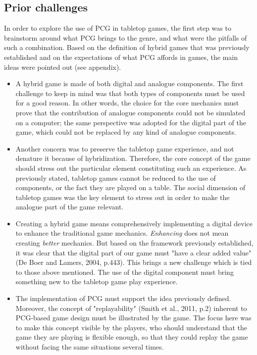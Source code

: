 \subsection{Prior challenges}
In order to explore the use of PCG in tabletop games, the first step was to brainstorm around what PCG brings to the genre, and what were the pitfalls of such a combination. Based on the definition of hybrid games that was previously established and on the expectations of what PCG affords in games, the main ideas were pointed out (see appendix).
\begin{itemize}
\item A hybrid game is made of both digital and analogue components. The first challenge to keep in mind was that both types of components must be used for a good reason. In other words, the choice for the core mechanics must prove that the contribution of analogue components could not be simulated on a computer; the same perspective was adopted for the digital part of the game, which could not be replaced by any kind of analogue components.  
\item Another concern was to preserve the tabletop game experience, and not denature it because of hybridization. Therefore, the core concept of the game should stress out the particular element constituting such an experience. As previously stated, tabletop games cannot be reduced to the use of components, or the fact they are played on a table. The social dimension of tabletop games was the key element to stress out in order to make the analogue part of the game relevant.
\item Creating a hybrid game means comprehensively implementing a digital device to enhance the traditional game mechanics. \textit{Enhancing} does not mean creating \textit{better} mechanics. But based on the framework previously established, it was clear that the digital part of our game must "have a clear added value" (De Boer and Lamers, 2004, p.443)\cite{chap:aug}. This brings a new challenge which is tied to those above mentioned. The use of the digital component must bring something new to the tabletop game play experience.
\item The implementation of PCG must support the idea previously defined. Moreover, the concept of "replayability" (Smith et al., 2011, p.2)\cite{pdf:pcgbased} inherent to PCG-based game design must be illustrated by the game. The focus here was to make this concept visible by the players, who should understand that the game they are playing is flexible enough, so that they could replay the game without facing the same situations several times.

\end{itemize}

